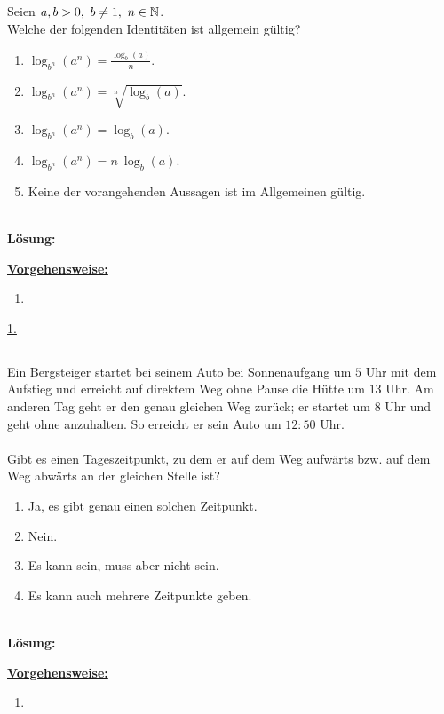 \newpage
\subsection*{}
Seien $ a,b >0, \ b \neq 1 , \ n \in \mathbb{N}  $.\\
Welche der folgenden Identitäten ist allgemein gültig?
\renewcommand{\labelenumi}{(\alph{enumi})}
\begin{enumerate}
	\item 
	$ \log_{b^n}(a^n) = \frac{\log_{b}(a)}{n} $.
	\item 
	$ \log_{b^n}(a^n) = \sqrt[n]{\log_{b}(a)} $.
	\item
	$ \log_{b^n}(a^n) = \log_{b}(a) $.
	\item
	$ \log_{b^n}(a^n) = n \ \log_{b}(a) $.
	\item
	Keine der vorangehenden Aussagen ist im Allgemeinen gültig.
\end{enumerate}
\ \\
\textbf{Lösung:}
\begin{mdframed}
\underline{\textbf{Vorgehensweise:}}
\renewcommand{\labelenumi}{\theenumi.}
\begin{enumerate}
\item 
\end{enumerate}
\end{mdframed}

\underline{1. }\\


 \newpage

\subsection*{}
Ein Bergsteiger startet bei seinem Auto bei Sonnenaufgang um $ 5 $ Uhr mit dem Aufstieg und erreicht auf direktem Weg ohne Pause die Hütte um $ 13 $ Uhr.
Am anderen Tag geht er den genau gleichen Weg zurück; er startet um $ 8 $ Uhr und geht ohne anzuhalten. So erreicht er sein Auto um $ 12:50 $ Uhr.\\
\\
Gibt es einen Tageszeitpunkt, zu dem er auf dem Weg aufwärts bzw. auf dem Weg abwärts an der gleichen Stelle ist? 
\renewcommand{\labelenumi}{(\alph{enumi})}
\begin{enumerate}
	\item 
	Ja, es gibt genau einen solchen Zeitpunkt.
	\item 
	Nein.
	\item
	Es kann sein, muss aber nicht sein.
	\item
	Es kann auch mehrere Zeitpunkte geben.
\end{enumerate}
\ \\
\textbf{Lösung:}
\begin{mdframed}
\underline{\textbf{Vorgehensweise:}}
\renewcommand{\labelenumi}{\theenumi.}
\begin{enumerate}
\item

\end{enumerate}
\end{mdframed}

